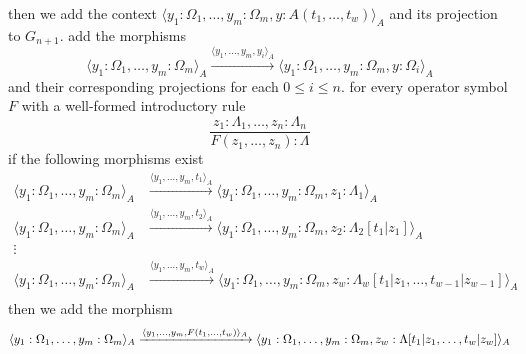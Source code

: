 \begin{itemize}
              then we add the context 
              $\langle y_1 : \Omega_1, \dots, y_m : \Omega_m, y : A(t_1, \dots, t_w) \rangle_A$
              and its projection to $G_{n+1}$.
     add the morphisms \[
                \langle y_1 : \Omega_1, \dots, y_m : \Omega_m \rangle_A 
                \xrightarrow{\langle y_1, \dots, y_m, y_i \rangle_A}
                \langle y_1 : \Omega_1, \dots, y_m : \Omega_m, y: \Omega_i \rangle_A
              \] and their corresponding projections
              for each $0 \leq i \leq n$.
     for every operator symbol $F$ with a well-formed
              introductory rule \[
              \dfrac{
                z_1 : \Lambda_1, \dots, z_n : \Lambda_n
              }{
                F(z_1, \dots, z_n) : \Lambda
              }
              \] if the following morphisms exist
              \begin{align*} %
                \langle y_1 : \Omega_1, \dots, y_m : \Omega_m \rangle_A 
                &\xrightarrow{\langle y_1, \dots, y_m, t_1 \rangle_A}
                \langle y_1 : \Omega_1, \dots, y_m : \Omega_m, z_1 : \Lambda_1 \rangle_A \\
                \langle y_1 : \Omega_1, \dots, y_m : \Omega_m \rangle_A
                &\xrightarrow{\langle y_1, \dots, y_m, t_2 \rangle_A}
                \langle y_1 : \Omega_1, \dots, y_m : \Omega_m, z_2 : \Lambda_2[t_1 | z_1] \rangle_A \\
                \vdots \\
                \langle y_1 : \Omega_1, \dots, y_m : \Omega_m \rangle_A
                &\xrightarrow{\langle y_1, \dots, y_m, t_w \rangle_A}
                \langle y_1 : \Omega_1, \dots, y_m : \Omega_m, z_w : \Lambda_w[t_1 | z_1, \dots, t_{w-1} | z_{w-1}] \rangle_A \\
              \end{align*}
              then we add the morphism
              \[ %
                \langle y_1 : \Omega_1, \dots, y_m : \Omega_m \rangle_A
                \xrightarrow{\langle y_1, \dots, y_m, F(t_1, \dots, t_w) \rangle_A}
                \langle y_1 : \Omega_1, \dots, y_m : \Omega_m, z_w : \Lambda[t_1 | z_1, \dots, t_w | z_w] \rangle_A \\
              \]
 

\end{itemize}

